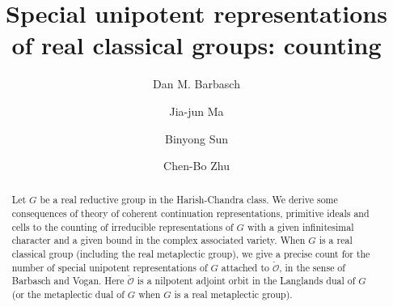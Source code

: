 \documentclass[12pt,a4paper]{amsart}
\newcommand{\CO}{{\mathcal {O}}}
\numberwithin{equation}{section}
\theoremstyle{remark}
\begin{document}
\title[]{Special unipotent representations of real classical groups: counting}

\author [D. Barbasch] {Dan M. Barbasch}
\address{the Department of Mathematics\\
  310 Malott Hall, Cornell University, Ithaca, New York 14853 }

\author [J.-J. Ma] {Jia-jun Ma}
\address{School of Mathematical Sciences\\
  Xiamen University\\
  Xiamen, China} 

\author [B. Sun] {Binyong Sun}
\address{Institute for Advanced Study in Mathematics\\
 Zhejiang University\\
  Hangzhou, China} 


\author [C.-B. Zhu] {Chen-Bo Zhu}
\address{Department of Mathematics\\
  National University of Singapore\\
  10 Lower Kent Ridge Road, Singapore 119076} 




 


\begin{abstract} Let $G$ be a real reductive group in the Harish-Chandra class. We derive some consequences of theory of coherent continuation representations, primitive ideals and cells to the counting of irreducible representations of $G$ with a given infinitesimal character and a given bound in the complex associated variety. When $G$ is a real classical group (including the real metaplectic group), we give a precise count for the number of special unipotent representations of $G$ attached to $\check \CO$, in the sense of Barbasch and Vogan. Here $\check \CO$ is a nilpotent adjoint orbit in the Langlands dual of $G$ (or the metaplectic dual of $G$ when $G$ is a real metaplectic group).
\end{abstract}
\end{document}
